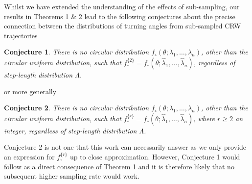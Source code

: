 \documentclass[english]{article}
\newtheorem{conjecture}{Conjecture}
\begin{document}
Whilst we have extended the understanding of the effects of sub-sampling, our results in Theorems 1 \& 2 lead to the following conjectures about the precise connection between the distributions of turning angles from sub-sampled CRW trajectories
\begin{conjecture}
    There is no circular distribution $f_\circ (\theta;\lambda_1,\ldots,\lambda_n)$, other than the circular uniform distribution, such that $f^{\{2\}}_{\circ}=f_\circ (\theta;\hat{\lambda}_1,\ldots,\hat{\lambda}_n)$, regardless of step-length distribution $\Lambda$.
\end{conjecture}
or more generally
\begin{conjecture}
    There is no circular distribution $f_\circ (\theta;\lambda_1,\ldots,\lambda_n)$, other than the circular uniform distribution, such that $f^{\{r\}}_{\circ}=f_\circ (\theta;\hat{\lambda}_1,\ldots,\hat{\lambda}_n)$, where $r\geq2$ an integer, regardless of step-length distribution $\Lambda$. 
\end{conjecture}
Conjecture 2 is not one that this work can necessarily answer as we only provide an expression for $f_\circ^{\{r\}}$ up to close approximation.  However, Conjecture 1 would follow as a direct consequence of Theorem 1 and it is therefore likely that no subsequent higher sampling rate would work.  
\end{document}
